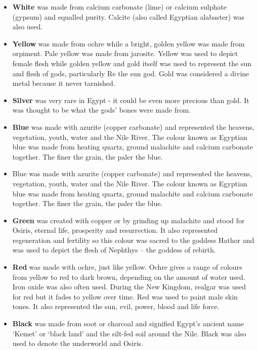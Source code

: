 	\begin{itemize}
		\item \textbf{White} was made from calcium carbonate (lime) or calcium sulphate (gypsum) and equalled purity. Calcite (also called Egyptian alabaster) was also used.
		
		\item \textbf{Yellow} was made from ochre while a bright, golden yellow was made from orpiment. Pale yellow was made from jarosite. Yellow was used to depict female flesh while golden yellow and gold itself was used to represent the sun and flesh of gods, particularly Re the sun god. Gold was considered a divine metal because it never tarnished.
		
		\item \textbf{Silver} was very rare in Egypt - it could be even more precious than gold. It was thought to be what the gods' bones were made from.
		
		\item \textbf{Blue} was made with azurite (copper carbonate) and represented the heavens, vegetation, youth, water and the Nile River. The colour known as Egyptian blue was made from heating quartz, ground malachite and calcium carbonate together. The finer the grain, the paler the blue.
		
		\item Blue was made with azurite (copper carbonate) and represented the heavens, vegetation, youth, water and the Nile River. The colour known as Egyptian blue was made from heating quartz, ground malachite and calcium carbonate together. The finer the grain, the paler the blue.
		
		\item \textbf{Green} was created with copper or by grinding up malachite and stood for Osiris, eternal life, prosperity and resurrection. It also represented regeneration and fertility so this colour was sacred to the goddess Hathor and was used to depict the flesh of Nephthys – the goddess of rebirth.
		
		\item\textbf{ Red} was made with ochre, just like yellow. Ochre gives a range of colours from yellow to red to dark brown, depending on the amount of water used. Iron oxide was also often used. During the New Kingdom, realgar was used for red but it fades to yellow over time. Red was used to paint male skin tones. It also represented the sun, evil, power, blood and life force.
		
		\item \textbf{Black} was made from soot or charcoal and signified Egypt’s ancient name ‘Kemet’ or ‘black land’ and the silt-fed soil around the Nile. Black was also used to denote the underworld and Osiris.
	\end{itemize}


